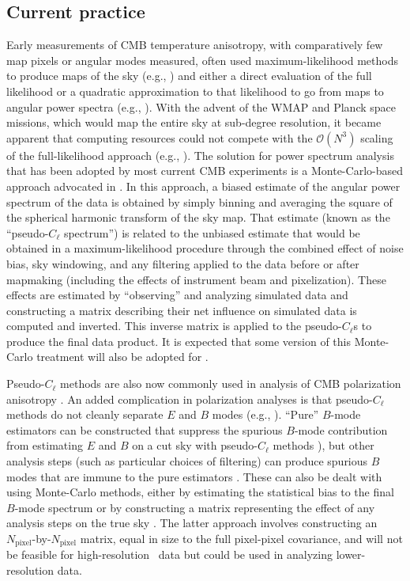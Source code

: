 \subsection{Current practice}
\label{se:current}
Early measurements of CMB temperature anisotropy, with comparatively few map pixels or angular modes
measured, often used maximum-likelihood methods to produce maps of the sky (e.g., \cite{wright96}) and
either a direct evaluation of the full likelihood or a quadratic approximation to that likelihood to go from 
maps to angular power spectra (e.g., \cite{bond98a}). With the advent of the WMAP and Planck space 
missions, which would map the entire sky at sub-degree resolution, it became apparent that computing
resources could not compete with the $\mathcal{O}(N^3)$ scaling of the full-likelihood approach 
(e.g., \cite{borrill99}). The solution for power spectrum analysis
that has been adopted by most current CMB experiments is a
Monte-Carlo-based approach advocated in \cite{hivon02}. In this approach, a biased estimate of
the angular power spectrum of the data is obtained by simply binning and averaging the square 
of the spherical harmonic transform of the sky map. That estimate (known as the 
``pseudo-$C_\ell$ spectrum'') is related to the unbiased 
estimate that would be obtained in a maximum-likelihood procedure through the combined effect
of noise bias, sky windowing, and any filtering applied to the data before or after mapmaking
(including the effects of instrument beam and pixelization). These effects are estimated by ``observing''
and analyzing simulated data and constructing a matrix describing their net influence on simulated data is 
computed and inverted. This inverse matrix is applied to the pseudo-$C_\ell$s to produce the 
final data product. It is expected that some version of this Monte-Carlo treatment will also be 
adopted for \cmbexp.

Pseudo-$C_\ell$ methods are also now commonly used in analysis of CMB polarization anisotropy
\cite{planck15-11,naess14,crites15}. An added complication in polarization analyses is that 
pseudo-$C_\ell$ methods do not cleanly separate $E$ and $B$ modes (e.g., \cite{challinor05}).
``Pure'' $B$-mode estimators can be constructed that suppress the spurious $B$-mode contribution
from estimating $E$ and $B$ on a cut sky with pseudo-$C_\ell$ methods \cite{smith06}), but 
other analysis steps (such as particular choices of filtering) can produce spurious $B$ modes that
are immune to the pure estimators \cite{keisler15}. These can also be dealt with using Monte-Carlo
methods, either by estimating the statistical bias to the final $B$-mode spectrum or by constructing
a matrix representing the effect of any analysis steps on the true sky \cite{BICEP2014}. The latter
approach involves constructing an $N_\mathrm{pixel}$-by-$N_\mathrm{pixel}$ matrix, equal in size to the 
full pixel-pixel covariance, and will not be feasible for high-resolution \cmbexp\ data but could be 
used in analyzing lower-resolution data.

